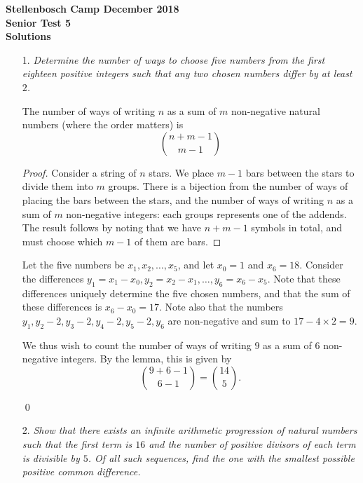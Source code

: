 \documentclass[a4paper, 12pt]{article}
\begin{document}
\begin{center}
\textbf{Stellenbosch Camp December 2018 \\ Senior Test 5} \\
\textbf{Solutions}
\end{center}
\vspace{5mm}

\begin{enumerate}
    
\item[1.]  \textit{Determine the number of ways to choose five numbers from the first eighteen positive integers such that any two chosen numbers differ by at least $2$.}

\begin{lemma}
The number of ways of writing $n$ as a sum of $m$ non-negative natural numbers (where the order matters) is
\[
	\binom{n + m - 1}{m - 1}
\]
\end{lemma}
\begin{proof}
Consider a string of $n$ stars. We place $m - 1$ bars between the stars to divide them into $m$ groups. There is a bijection from the number of ways of placing the bars between the stars, and the number of ways of writing $n$ as a sum of $m$ non-negative integers: each groups represents one of the addends. The result follows by noting that we have $n + m - 1$ symbols in total, and must choose which $m - 1$ of them are bars.
\end{proof}

Let the five numbers be $x_1, x_2, \dots, x_5$, and let $x_0 = 1$ and $x_6 = 18$. Consider the differences $y_1 = x_1 - x_0, y_2 = x_2 - x_1, \dots, y_6 = x_6 - x_5$. Note that these differences uniquely determine the five chosen numbers, and that the sum of these differences is $x_6 - x_0 = 17$. Note also that the numbers $y_1, y_2 - 2, y_3 - 2, y_4 - 2, y_5 - 2, y_6$ are non-negative and sum to $17 - 4 \times 2 = 9$.

We thus wish to count the number of ways of writing $9$ as a sum of $6$ non-negative integers. By the lemma, this is given by
\[
	\binom{9 + 6 - 1}{6 - 1} = \binom{14}{5}.
\]

\qed


\vspace{5mm}
\item[2.]  \textit{Show that there exists an infinite arithmetic progression of natural numbers such that the first term is $16$ and the number of positive divisors of each term is divisible by $5$. Of all such sequences, find the one with the smallest possible positive common difference.}


\end{enumerate}
\end{document}
